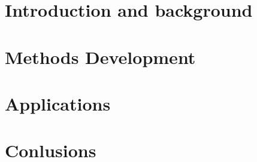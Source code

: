 


\renewcommand*{\chapterpagestyle}{empty}

\renewcommand*{\chapterpagestyle}{plain}
\cleardoublepage
\pagestyle{plain}

\renewcommand{\BrainFuckChapter}{
}

{}

\tableofcontents

\renewcommand{\BrainFuckChapter}{
}
\listoffigures

\renewcommand{\BrainFuckChapter}{
}

\listofalgorithms
{}




\cleardoublepage

\acresetall{}
\renewcommand*{\chapterpagestyle}{scrheadings}

\pagestyle{scrheadings}
% 

\part{Introduction and background}
\label{part:intro_background}




\part{Methods Development}
\label{part:methods-development}




\part{Applications}
\label{part:applications}


\part{Conlusions}
\label{part:conclusion}

% 
\begin{appendix}
  
  
\end{appendix}
\DeclareRobustCommand{\van}[3]{#2 #1}

\renewcommand{\bibname}{References}


\renewcommand{\BrainFuckChapter}{}
\ifx\finalversion\undefined
\listoftodos
\fi
%


